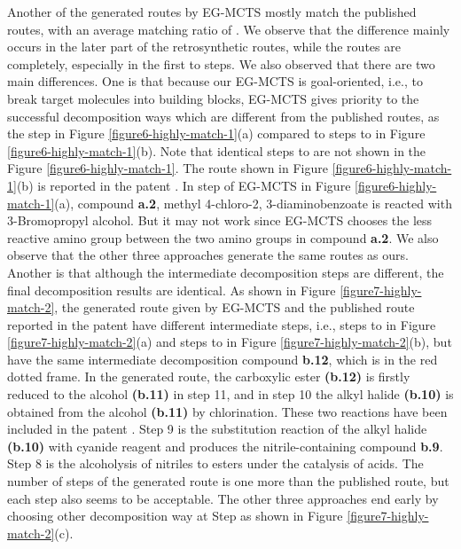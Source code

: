 \documentclass[sn-mathphys,Numbered]{sn-jnl}
\begin{document}
Another  of the generated routes by EG-MCTS mostly match the published routes, with an average matching ratio of .
We observe that the difference mainly occurs in the later part of the retrosynthetic routes, while the routes are completely, especially in the first  to  steps. 
We also observed that there are two main differences. 
One is that because our EG-MCTS is goal-oriented, i.e., to break target molecules into building blocks, EG-MCTS gives priority to the successful decomposition ways which are different from the published routes, as the step  in Figure \ref{figure6-highly-match-1}(a) compared to steps  to  in Figure \ref{figure6-highly-match-1}(b). Note that identical steps  to  are not shown in the Figure \ref{figure6-highly-match-1}. The route shown in Figure \ref{figure6-highly-match-1}(b) is reported in the patent \citep{paten-last}.
In step  of EG-MCTS in Figure \ref{figure6-highly-match-1}(a), compound \textbf{a.2}, methyl 4-chloro-2, 3-diaminobenzoate is reacted with 3-Bromopropyl alcohol. But it may not work since EG-MCTS chooses the less reactive amino group between the two amino groups in compound \textbf{a.2}.
We also observe that the other three approaches generate the same routes as ours.
Another is that although the intermediate decomposition steps are different, the final decomposition results are identical.
As shown in Figure \ref{figure7-highly-match-2}, the generated route given by EG-MCTS and the published route reported in the patent \citep{paten-middle} have different intermediate steps, i.e., steps  to  in Figure \ref{figure7-highly-match-2}(a) and steps  to  in Figure \ref{figure7-highly-match-2}(b), but have the same intermediate decomposition compound \textbf{b.12}, which is in the red dotted frame.
In the generated route, the carboxylic ester \textbf{(b.12)} is firstly reduced to the alcohol \textbf{(b.11)} in step 11, and in step 10 the alkyl halide \textbf{(b.10)} is obtained from the alcohol \textbf{(b.11)} by chlorination. These two reactions have been included in the patent \citep{paten1}.
Step 9 is the substitution reaction of the alkyl halide \textbf{(b.10)} with cyanide reagent and produces the nitrile-containing compound \textbf{b.9}. Step 8 is the alcoholysis of nitriles to esters under the catalysis of acids. The number of steps of the generated route is one more than the published route, but each step also seems to be acceptable.
The other three approaches end early by choosing other decomposition way at Step  as shown in Figure \ref{figure7-highly-match-2}(c).
\end{document}
